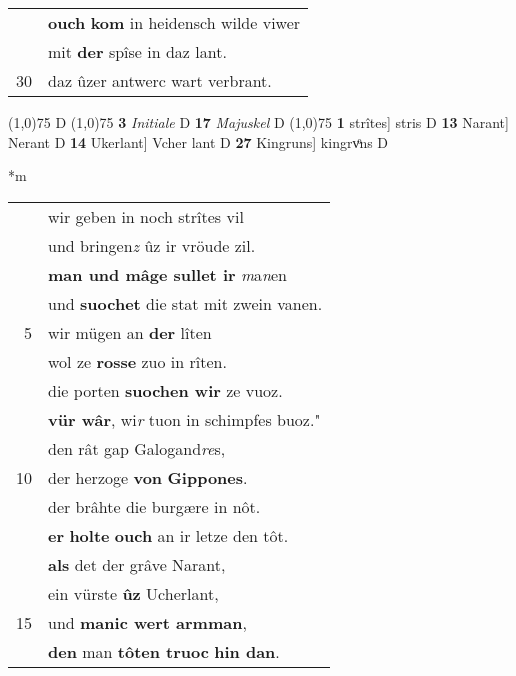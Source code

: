 \documentclass[8pt,a4paper,notitlepage]{article}
\begin{document}
\begin{table}[ht]
\begin{minipage}[t]{0.5\linewidth}
\begin{tabular}{rl}
 & \textbf{ouch} \textbf{kom} in heidensch wilde viwer\\ 
 & mit \textbf{der} spîse in daz lant.\\ 
30 & daz ûzer antwerc wart verbrant.\\ 
\end{tabular}
\scriptsize
\line(1,0){75} \newline
D \newline
\line(1,0){75} \newline
\textbf{3} \textit{Initiale} D  \textbf{17} \textit{Majuskel} D  \newline
\line(1,0){75} \newline
\textbf{1} strîtes] stris D \textbf{13} Narant] Nerant D \textbf{14} Ukerlant] Vcher lant D \textbf{27} Kingruns] kingrvͦns D \newline
\end{minipage}
\hspace{0.5cm}
\begin{minipage}[t]{0.5\linewidth}
\small
\begin{center}*m
\end{center}
\begin{tabular}{rl}
 & wir geben in noch strîtes vil\\ 
 & und bringen\textit{z} ûz ir vröude zil.\\ 
 & \textbf{man und mâge sullet ir} \textit{m}a\textit{n}en\\ 
 & und \textbf{suochet} die stat mit zwein vanen.\\ 
5 & wir mügen an \textbf{der} lîten\\ 
 & wol ze \textbf{rosse} zuo in rîten.\\ 
 & die porten \textbf{suochen wir} ze vuoz.\\ 
 & \textbf{vür wâr}, wi\textit{r} tuon in schimpfes buoz."\\ 
 & den rât gap Galogand\textit{re}s,\\ 
10 & der herzoge \textbf{von} \textbf{Gippones}.\\ 
 & der brâhte die burgære in nôt.\\ 
 & \textbf{er} \textbf{holte} \textbf{ouch} an ir letze den tôt.\\ 
 & \textbf{als} det der grâve Narant,\\ 
 & ein vürste \textbf{ûz} Ucherlant,\\ 
15 & und \textbf{manic wert armman},\\ 
 & \textbf{den} man \textbf{tôten truoc} \textbf{hin dan}.\\ 

\end{tabular}
\end{minipage}
\end{table}
\end{document}
